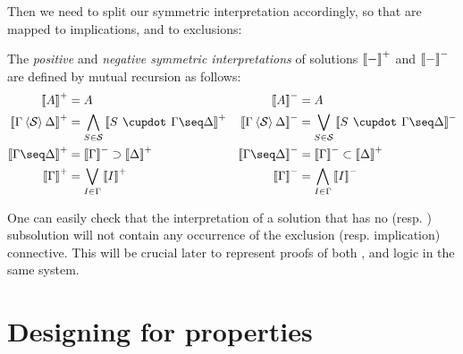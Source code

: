 \begin{scope}
Then we need to split our symmetric interpretation accordingly, so that 
 are mapped to implications, and   to
exclusions:

\begin{definition}
  The \emph{positive} and \emph{negative symmetric interpretations} of solutions
  $\left\llbracket - \right\rrbracket^+$ and $\left\llbracket - \right\rrbracket^-$ are defined by mutual recursion as
  follows:
  \begin{align*}
    \psint{A} &= A &
    \nsint{A} &= A \\
    \psint{\Gamma \piq{\cS} \Delta} &=
      \bigwedge_{S \in \cS} \psint{S \mix \Gamma \seq \Delta} &
    \nsint{\Gamma \piq{\cS} \Delta} &=
      \bigvee_{S \in \cS} \nsint{S \mix \Gamma \seq \Delta} \\
    \psint{\Gamma \seq \Delta} &=
      \nsint{\Gamma} \limp \psint{\Delta} &
    \nsint{\Gamma \seq \Delta} &=
      \nsint{\Gamma} \lsub \psint{\Delta} \\
    \psint{\Gamma} &= \bigvee_{I \in \Gamma}{\psint{I}} &
    \nsint{\Gamma} &= \bigwedge_{I \in \Gamma}{\nsint{I}}
  \end{align*}
\end{definition}

One can easily check that the interpretation of a solution that has no 
(resp. ) subsolution will not contain any occurrence of the exclusion
(resp. implication) connective. This will be crucial later to represent proofs
of both ,  and  logic in the
same system.

\section{Designing for properties}


\end{scope}
